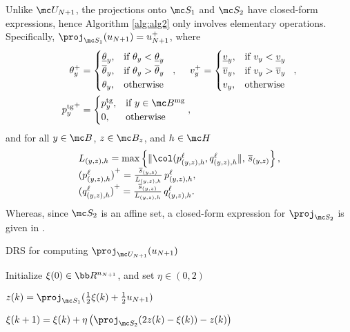 %
Unlike $\mc U_{N+1}$, the projections onto $\mc S_1$ and $\mc S_2$ have closed-form expressions, hence Algorithm \ref{alg:alg2} only involves elementary operations. Specifically,
$	\proj_{\mc S_1}(u_{N+1})=
u_{N+1}^+$, where
\begin{align*}
	\theta_y^+ &=
	\begin{cases}
		\underline{\theta}_y, & \text{if } \theta_y < \underline{\theta}_y\\
		\overline{\theta}_y, & \text{if } \theta_y > \overline{\theta}_y\\
		\theta_y, & \text{otherwise } \
	\end{cases}, \quad \
	v_y^+ = 
	\begin{cases}
		\underline{v}_y, & \text{if } v_y < \underline{v}_y\\
		\overline{v}_y, & \text{if } v_y > \overline{v}_y\\
		v_y, & \text{otherwise } \
	\end{cases},
	\\
	{p_y^{\text{tg}}}^+ &= 
	\begin{cases}
		p_y^{\text{tg}}, & \text{if } y \in \mc B^{\text{mg}}\\
		0, & \text{otherwise} 
	\end{cases},
\end{align*}
and for all $y \in \mc B$, $z \in \mc B_z$, and  $h \in \mc H$
\begin{align*}
	\begin{array}{l}
		L_{(y,z),h} = \max \left\{ \|\col(p^\ell_{(y,z),h} , q^\ell_{(y,z),h} \|, \, \overline{s}_{(y,z)} \right\},\\[.2em]
		{(p^\ell_{(y,z),h})}^+  = \tfrac{\overline{s}_{(y,z)}}{
			L_{(y,z),h}
		}\,  p^\ell_{(y,z),h}, \\[.2em]
		{(q^\ell_{(y,z),h})}^+  = \tfrac{\overline{s}_{(y,z)}}{
			L_{(y,z),h}
		}\, q^\ell_{(y,z),h}.
	\end{array}
\end{align*}
Whereas, since $\mc S_2$ is an affine set, a closed-form expression for $\proj_{\mc S_2}$ is given in \cite[Example 29.17(ii)]{bauschke2011convex}.

\begin{algorithm}[]
	\caption{DRS for computing $\proj_{\mc U_{N+1}}(u_{N+1})$}
	\label{alg:alg2}
	\begin{algorithmic}[1]
		
		\smallskip
		\State Initialize $\xi(0) \in \bb R^{n_{N+1}}$, and set $\eta \in (0,2)$
		\IUC{ }
		
		\smallskip
		\State
		$z(k) = \proj_{\mc S_1}(\frac{1}{2} \xi(k) + \frac{1}{2} u_{N+1})$ 
		
		
		\smallskip
		\State
		$\xi(k+1) = \xi(k) + \eta \left( \proj_{\mc S_2}    (2z(k)-\xi(k)) - z(k)
		\right)$
		\EndIUC
		
	\end{algorithmic}
\end{algorithm}